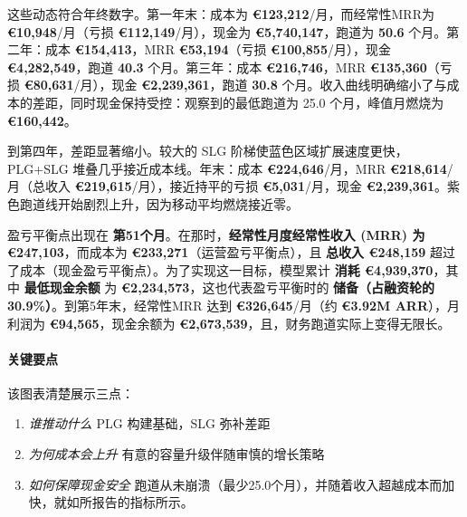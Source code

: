 \documentclass[11点, A4纸, 单面]{article}
\begin{document}
这些动态符合年终数字。第一年末：成本为 \textbf{€123,212}/月，而经常性MRR为 \textbf{€10,948}/月（亏损 \textbf{€112,149}/月），现金为 \textbf{€5,740,147}，跑道为 \textbf{50.6} 个月。第二年：成本 \textbf{€154,413}，MRR \textbf{€53,194}（亏损 \textbf{€100,855}/月），现金 \textbf{€4,282,549}，跑道 \textbf{40.3} 个月。第三年：成本 \textbf{€216,746}，MRR \textbf{€135,360}（亏损 \textbf{€80,631}/月），现金 \textbf{€2,239,361}，跑道 \textbf{30.8} 个月。收入曲线明确缩小了与成本的差距，同时现金保持受控：观察到的最低跑道为 25.0 个月，峰值月燃烧为 \textbf{€160,442}。

到第四年，差距显著缩小。较大的 SLG 阶梯使蓝色区域扩展速度更快，PLG+SLG 堆叠几乎接近成本线。年末：成本 \textbf{€224,646}/月，MRR \textbf{€218,614}/月（总收入 \textbf{€219,615}/月），接近持平的亏损 \textbf{€5,031}/月，现金 \textbf{€2,239,361}。紫色跑道线开始剧烈上升，因为移动平均燃烧接近零。



盈亏平衡点出现在 \textbf{第51个月}。在那时，\textbf{经常性月度经常性收入 (MRR) 为 €247{,}103}，而成本为 \textbf{€233{,}271}（运营盈亏平衡点），且 \textbf{总收入 €248{,}159} 超过了成本（现金盈亏平衡点）。为了实现这一目标，模型累计 \textbf{消耗 €4{,}939{,}370}，其中 \textbf{最低现金余额} 为 \textbf{€2{,}234{,}573}，这也代表盈亏平衡时的 \textbf{储备（占融资轮的30.9\%）}。到第5年末，经常性MRR 达到 \textbf{€326{,}645}/月（约 \textbf{€3.92M ARR}），月利润为 \textbf{€94{,}565}，现金余额为 \textbf{€2{,}673{,}539}，且，财务跑道实际上变得无限长。

\paragraph{关键要点}
该图表清楚展示三点：
\begin{enumerate}
\item \emph{谁推动什么} PLG 构建基础，SLG 弥补差距
\item \emph{为何成本会上升} 有意的容量升级伴随审慎的增长策略
\item \emph{如何保障现金安全} 跑道从未崩溃（最少25.0个月），并随着收入超越成本而加快，就如所报告的指标所示。
\end{enumerate}
\end{document}

